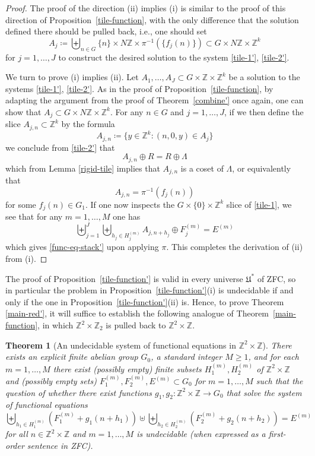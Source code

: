 \documentclass[reqno,a4paper,12pt]{amsart}
\numberwithin{equation}{section}
\numberwithin{figure}{section}
\def\Z{\mathbb{Z}}
\renewcommand\geq{\geqslant}
\newcommand{\Universe}{{\mathfrak{U}}}
\theoremstyle{plain}
\newtheorem{theorem}[thm]{Theorem}
\theoremstyle{definition}
\newcommand{\thmref}[1]{Theorem~\ref{#1}}
\newcommand{\propref}[1]{Proposition~\ref{#1}}
\begin{document}
\begin{proof}
The proof of the direction  (ii) implies (i) is similar to the proof of this direction of \propref{tile-function}, with the only difference that the solution defined there should be pulled back, i.e., one should set
$$A_j \coloneqq \biguplus_{n\in G} \{n\} \times N\Z\times \pi^{-1}(\{f_j(n)\}) \subset G \times N\Z \times \Z^k$$
for $j=1,\dots,J$ to construct the desired solution to the system \eqref{tile-1'}, \eqref{tile-2'}.

We turn to prove (i) implies (ii). Let $A_1,\dots,A_J\subset G\times \Z\times \Z^k$ be a solution to the systems \eqref{tile-1'}, \eqref{tile-2'}.
As in the proof of 
\propref{tile-function}, by adapting the argument from the proof of \thmref{combine'} once again, one can show that $A_j\subset G \times N\Z\times \Z^k$.  For any $n \in G$ and $j=1,\dots,J$, if we then define the slice $A_{j,n} \subset \Z^k$ by the formula
$$ A_{j,n} \coloneqq \{ y \in \Z^k: (n,0,y) \in A_j \}$$
we conclude from \eqref{tile-2'} that
$$ A_{j,n} \oplus R = R \oplus \Lambda $$
which from Lemma \ref{rigid-tile} implies that $A_{j,n}$ is a coset of $\Lambda$, or equivalently that
$$ A_{j,n} = \pi^{-1}(f_j(n))$$
for some $f_j(n) \in G_1$. If one now inspects the $G \times \{0\} \times \Z^k$ slice of \eqref{tile-1}, we see that for any $m=1,\dots,M$ one has
$$ \biguplus_{j=1}^J \biguplus_{h_j \in H_j^{(m)}} A_{j,n+h_j} \oplus F_j^{(m)} = E^{(m)} $$
which gives \eqref{func-eq-stack'} upon applying $\pi$. This completes the derivation of (ii) from (i).
\end{proof}


The proof of \propref{tile-function'} is valid in every universe $\Universe^*$ of ZFC, so in particular the problem in \propref{tile-function'}(i) is undecidable if and only if the one in  \propref{tile-function'}(ii) is.  Hence, to prove Theorem \ref{main-red'}, it will suffice to establish the following analogue of  \thmref{main-function}, in which $\Z^2\times \Z_2$ is pulled back to $\Z^2 \times \Z$.

\begin{theorem}[An undecidable system of functional equations in $\Z^2\times \Z$]\label{main-function'}  There exists an explicit finite abelian group $G_0$, a standard integer $M \geq 1$, and for each $m=1,\dots,M$ there exist (possibly empty) finite subsets $H_1^{(m)}, H_2^{(m)}$ of $\Z^2 \times \Z$ and (possibly empty sets) $F_1^{(m)}, F_2^{(m)}, E^{(m)} \subset G_0$ for $m=1,\dots,M$ such that the question of whether there exist  functions $g_1,g_2 \colon \Z^2 \times \Z \to G_0$ that solve
the system of functional equations
\begin{equation}\label{func-eq'}
\biguplus_{h_1 \in H_1^{(m)}} (F_1^{(m)} + g_1(n+h_1)) \uplus
\biguplus_{h_2 \in H_2^{(m)}} (F_2^{(m)} + g_2(n+h_2)) = E^{(m)}
\end{equation}
for all $n \in \Z^2\times \Z$ and $m=1,\dots,M$ is undecidable (when expressed as a first-order sentence in ZFC).
\end{theorem}
\end{document}
